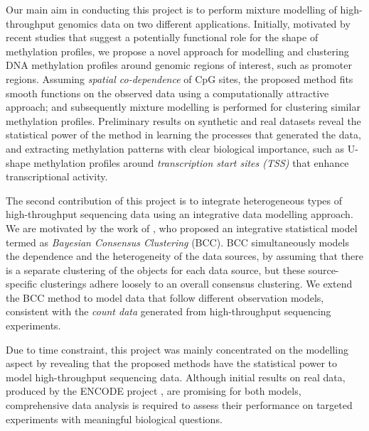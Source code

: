 Our main aim in conducting this project is to perform mixture modelling of high-throughput genomics data on two different applications. Initially, motivated by recent studies that suggest a potentially functional role for the shape of methylation profiles, we propose a novel approach for modelling and clustering DNA methylation profiles around genomic regions of interest, such as promoter regions. Assuming \emph{spatial co-dependence} of CpG sites, the proposed method fits smooth functions on the observed data using a computationally attractive approach; and subsequently mixture modelling is performed for clustering similar methylation profiles. Preliminary results on synthetic and real datasets reveal the statistical power of the method in learning the processes that generated the data, and extracting methylation patterns with clear biological importance, such as U-shape methylation profiles around \emph{transcription start sites (TSS)} that enhance transcriptional activity.

The second contribution of this project is to integrate heterogeneous types of high-throughput sequencing data using an integrative data modelling approach. We are motivated by the work of \citet{Lock2013}, who proposed an integrative statistical model termed as \emph{Bayesian Consensus Clustering} (BCC). BCC simultaneously models the dependence and the heterogeneity of the data sources, by assuming that there is a separate clustering of the objects for each data source, but these source-specific clusterings adhere loosely to an overall consensus clustering. We extend the BCC method to model data that follow different observation models, consistent with the \emph{count data} generated from high-throughput sequencing experiments.

Due to time constraint, this project was mainly concentrated on the modelling aspect by revealing that the proposed methods have the statistical power to model high-throughput sequencing data. Although initial results on real data, produced by the ENCODE project \citet{Dunham2012}, are promising for both models, comprehensive data analysis is required to assess their performance on targeted experiments with meaningful biological questions. 


